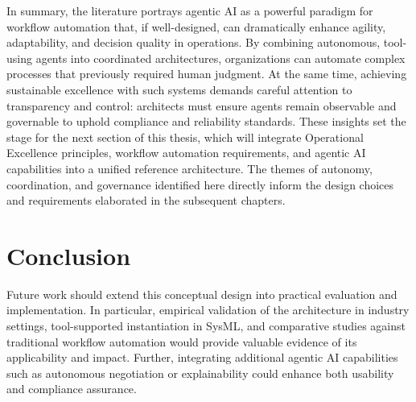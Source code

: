 In summary, the literature portrays agentic AI as a powerful paradigm for workflow automation that, if well-designed, can dramatically enhance agility, adaptability, and decision quality in operations. By combining autonomous, tool-using agents into coordinated architectures, organizations can automate complex processes that previously required human judgment. At the same time, achieving sustainable excellence with such systems demands careful attention to transparency and control: architects must ensure agents remain observable and governable to uphold compliance and reliability standards. These insights set the stage for the next section of this thesis, which will integrate Operational Excellence principles, workflow automation requirements, and agentic AI capabilities into a unified reference architecture. The themes of autonomy, coordination, and governance identified here directly inform the design choices and requirements elaborated in the subsequent chapters. 


\section{Conclusion}
Future work should extend this conceptual design into practical evaluation and implementation. In particular, empirical validation of the architecture in industry settings, tool-supported instantiation in SysML, and comparative studies against traditional workflow automation would provide valuable evidence of its applicability and impact. Further, integrating additional agentic AI capabilities such as autonomous negotiation or explainability could enhance both usability and compliance assurance.  

